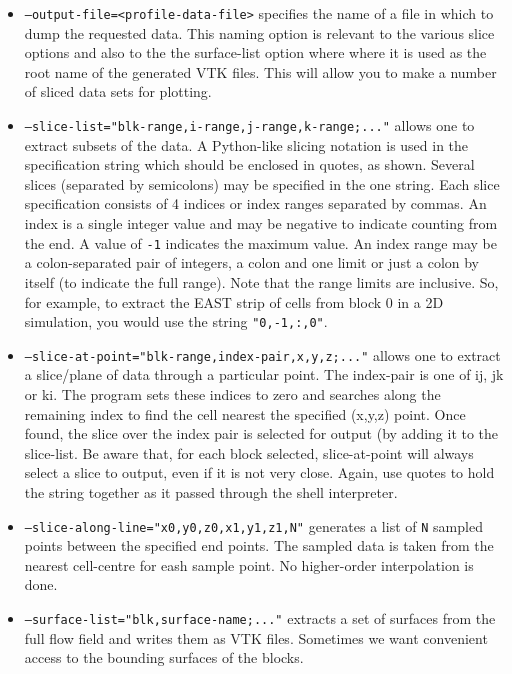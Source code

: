 \begin{itemize}
  \item \texttt{--output-file=<profile-data-file>} specifies the name of a file in which to dump the requested data.
     This naming option is relevant to the various slice options and also to the the surface-list option where
     where it is used as the root name of the generated VTK files.
     This will allow you to make a number of sliced data sets for plotting.
  \item \texttt{--slice-list="blk-range,i-range,j-range,k-range;..."} allows one to extract subsets of the data.
     A Python-like slicing notation is used in the specification string which should be enclosed in quotes, as shown. 
     Several slices (separated by semicolons) may be specified in the one string.
     Each slice specification consists of 4 indices or index ranges separated by commas.  
     An index is a single integer value and may be negative to indicate counting from the end.
     A value of \texttt{-1} indicates the maximum value.
     An index range may be a colon-separated pair of integers, a colon and one limit 
     or just a colon by itself (to indicate the full range).
     Note that the range limits are inclusive.
     So, for example, to extract the EAST strip of cells from block 0 in a 2D simulation, you would use
     the string \texttt{"0,-1,:,0"}.
  \item \texttt{--slice-at-point="blk-range,index-pair,x,y,z;..."} allows one to extract a slice/plane of data
     through a particular point.
     The index-pair is one of ij, jk or ki.  
     The program sets these indices to zero and searches along the remaining index to find the cell nearest 
     the specified (x,y,z) point.
     Once found, the slice over the index pair is selected for output (by adding it to the slice-list.
     Be aware that, for each block selected, slice-at-point will always select a slice to output, 
     even if it is not very close.
     Again, use quotes to hold the string together as it passed through the shell interpreter.
  \item \texttt{--slice-along-line="x0,y0,z0,x1,y1,z1,N"} generates a list of \texttt{N} sampled points between
     the specified end points.
     The sampled data is taken from the nearest cell-centre for eash sample point.
     No higher-order interpolation is done.
  \item \texttt{--surface-list="blk,surface-name;..."} extracts a set of surfaces from the full flow field and 
     writes them as VTK files.  
     Sometimes we want convenient access to the bounding surfaces of the blocks.

\end{itemize}
